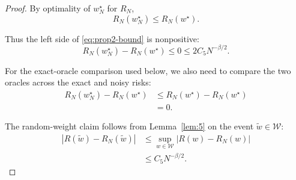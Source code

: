 \documentclass{article} %
\providecommand{\Risk}{R}
\providecommand{\wstar}{w^{\star}}
\begin{document}
\begin{proof}
By optimality of \(w_N^\star\) for \(\Risk_N\),
\begin{equation}
\label{eq:prop2-proof-opt}
\Risk_N(w_N^\star)
\le
\Risk_N(\wstar).
\end{equation}

Thus the left side of \eqref{eq:prop2-bound} is nonpositive:
\begin{equation}
\label{eq:prop2-proof-nonpos}
\Risk_N(w_N^\star)-\Risk_N(\wstar)
\le
0
\le
2C_5N^{-\beta/2}.
\end{equation}

For the exact-oracle comparison used below, we also need to compare the two
oracles across the exact and noisy risks:
\begin{align}
\Risk_N(w_N^\star)-\Risk_N(\wstar)
&\le
\Risk_N(\wstar)-\Risk_N(\wstar)
\label{eq:prop2-proof-a}
\\
&=
0 .
\label{eq:prop2-proof-b}
\end{align}

The random-weight claim follows from Lemma~\ref{lem:5} on the event
\(\widetilde w\in\mathcal W\):
\begin{align}
|\Risk(\widetilde w)-\Risk_N(\widetilde w)|
&\le
\sup_{w\in\mathcal W}|\Risk(w)-\Risk_N(w)|
\label{eq:prop2-proof-c}
\\
&\le
C_5N^{-\beta/2}.
\label{eq:prop2-proof-d}
\end{align}
\end{proof}
\end{document}
